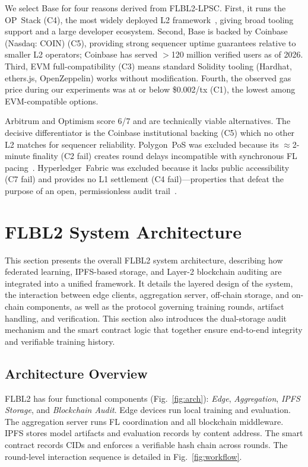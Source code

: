 \documentclass{llncs}
\begin{document}
We select Base for four reasons derived from FLBL2-LPSC.
First, it runs the OP~Stack (C4), the most
widely deployed L2 framework~\cite{zhao2024l2intro,neiheiser2023l2limits},
giving broad tooling support and a large developer ecosystem.
Second, Base is backed by Coinbase (Nasdaq: COIN) (C5), providing
strong sequencer uptime guarantees relative to smaller L2 operators;
Coinbase has served $>$120 million verified users as of 2026.
Third, EVM full-compatibility (C3) means standard Solidity tooling
(Hardhat, ethers.js, OpenZeppelin) works without modification.
Fourth, the observed gas price during our experiments was at or below
\$0.002/tx (C1), the lowest among EVM-compatible options.

Arbitrum and Optimism score 6/7 and are technically viable alternatives. The decisive differentiator is the Coinbase institutional backing (C5)
which no other L2 matches for sequencer reliability. Polygon~PoS was
excluded because its $\approx$2-minute finality (C2 fail) creates round
delays incompatible with synchronous FL pacing~\cite{mandal2023l2}.
Hyperledger~Fabric was excluded because it lacks public accessibility
(C7 fail) and provides no L1 settlement (C4 fail)---properties that
defeat the purpose of an open, permissionless audit trail~\cite{bayan2023exploring}.


\FloatBarrier
\section{FLBL2 System Architecture}
\label{sec:arch}
This section presents the overall FLBL2 system architecture, describing how federated learning, IPFS-based storage, and Layer-2 blockchain auditing are integrated into a unified framework. It details the layered design of the system, the interaction between edge clients, aggregation server, off-chain storage, and on-chain components, as well as the protocol governing training rounds, artifact handling, and verification. This section also introduces the dual-storage audit mechanism and the smart contract logic that together ensure end-to-end integrity and verifiable training history.

\subsection{Architecture Overview}
FLBL2 has four functional components (Fig.~\ref{fig:arch}): \emph{Edge},
\emph{Aggregation}, \emph{IPFS Storage}, and \emph{Blockchain Audit}.
Edge devices run local training and evaluation. The aggregation server
runs FL coordination and all blockchain middleware. IPFS stores model
artifacts and evaluation records by content address. The smart contract
records CIDs and enforces a verifiable hash chain across rounds.
The round-level interaction sequence is detailed in Fig.~\ref{fig:workflow}.
\end{document}
